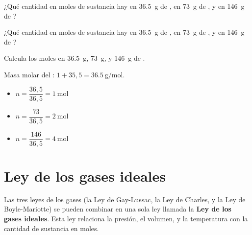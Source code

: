 \begin{exercise}
    ¿Qué cantidad en moles de sustancia hay en \qty{36.5}{\g} de , en \qty{73}{\g} de , y en \qty{146}{\g} de ?
    \begin{solu}
        ¿Qué cantidad en moles de sustancia hay en \qty{36.5}{\g} de , en \qty{73}{\g} de , y en \qty{146}{\g} de ?

        Calcula los moles en \qty{36.5}{\g}, \qty{73}{\g}, y \qty{146}{\g} de .

        Masa molar del : \( 1 + 35{,}5 = \qty{36.5}{\g\per\mole} \).

        \begin{itemize}
            \item \( n = \dfrac{36{,}5}{36{,}5} = \qty{1}{\mole} \)
            \item \( n = \dfrac{73}{36{,}5} = \qty{2}{\mole} \)
            \item \( n = \dfrac{146}{36{,}5} = \qty{4}{\mole} \)
        \end{itemize}
    \end{solu}
\end{exercise}


\section{Ley de los gases ideales}

Las tres leyes de los gases (la Ley de Gay-Lussac, la Ley de Charles, y la Ley de Boyle-Mariotte) se pueden combinar en una sola ley llamada la \textbf{Ley de los gases ideales}. Esta ley relaciona la presión, el volumen, y la temperatura con la cantidad de sustancia en moles.

